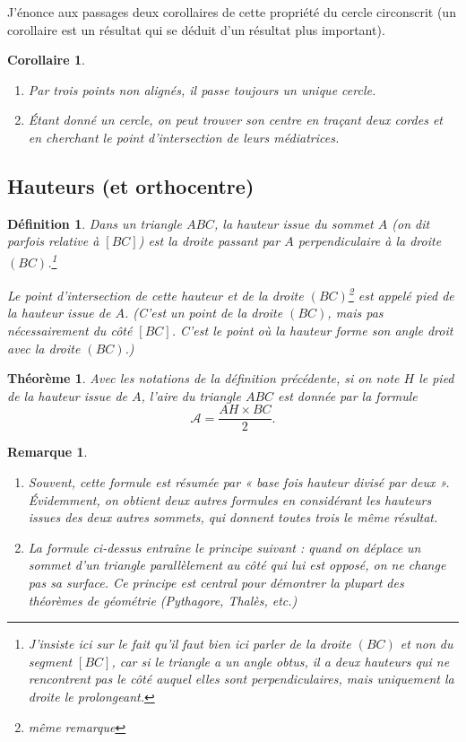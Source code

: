 \documentclass[12 pt]{article}
\theoremstyle{plain}
\newcounter{n}
\numberwithin{n}{section}
\newtheorem{theo}{Théorème}
\newtheorem{cor}[n]{Corollaire}
\newtheorem{df}[n]{Définition}
\newtheorem{rmq}[n]{Remarque}
\begin{document}
J'énonce aux passages deux corollaires de cette propriété du cercle circonscrit (un corollaire est un résultat qui se 
déduit d'un résultat plus important). 
\begin{cor}
\begin{enumerate}
\item Par trois points non alignés, il passe toujours un unique cercle.
\item Étant donné un cercle, on peut trouver son centre en traçant deux cordes et en cherchant le point d'intersection de leurs médiatrices.
\end{enumerate}
\end{cor}



\subsection{Hauteurs (et orthocentre)}

\begin{df}
Dans un triangle $ABC$, la \emph{hauteur issue du sommet $A$} (on dit parfois relative à $[BC]$)
est la droite passant par $A$ perpendiculaire à la droite $(BC)$.\footnote{J'insiste ici sur le fait qu'il faut 
bien ici parler de la droite $(BC)$ et non du segment $[BC]$, car si le triangle a un angle obtus, 
il a deux hauteurs qui ne rencontrent pas le côté auquel elles sont perpendiculaires, 
mais uniquement la droite le prolongeant.}

Le point d'intersection de cette hauteur et de la droite $(BC)$\footnote{même remarque} est appelé \emph{pied 
de la hauteur issue de $A$}. (C'est un point de la droite $(BC)$, mais pas nécessairement du côté $[BC]$. C'est le point où la hauteur forme son angle droit avec la droite $(BC)$.)
\end{df}

\begin{theo}
Avec les notations de la définition précédente, si on note $H$ le pied de la hauteur issue de $A$, l'aire du triangle 
$ABC$ est donnée par la formule \[\mathcal A = \frac{AH \times BC}2. \]\end{theo}

\begin{rmq}\begin{enumerate}
\item Souvent, cette formule est résumée par « base fois hauteur divisé par deux ». Évidemment, on obtient deux autres formules en considérant les hauteurs issues des deux autres sommets, qui donnent toutes trois le même résultat.
\item La formule ci-dessus entraîne le principe suivant : \emph{quand on déplace un sommet d'un triangle parallèlement
au côté qui lui est opposé, on ne change pas sa surface}. Ce principe est central pour démontrer la plupart des 
théorèmes de géométrie (Pythagore, Thalès, etc.) \end{enumerate}
\end{rmq}
\end{document}
